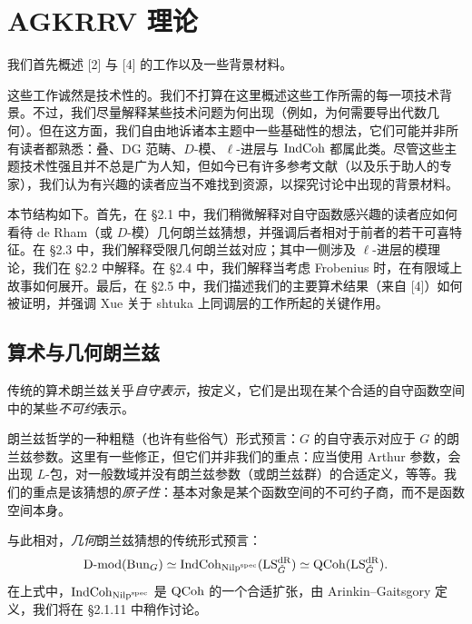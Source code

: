 \section{AGKRRV 理论}

我们首先概述 [2] 与 [4] 的工作以及一些背景材料。

这些工作诚然是技术性的。我们不打算在这里概述这些工作所需的每一项技术背景。不过，我们尽量解释某些技术问题为何出现（例如，为何需要导出代数几何）。但在这方面，我们自由地诉诸本主题中一些基础性的想法，它们可能并非所有读者都熟悉：叠、DG 范畴、$D$-模、$\ell$-进层与 $\mathrm{IndCoh}$ 都属此类。尽管这些主题技术性强且并不总是广为人知，但如今已有许多参考文献（以及乐于助人的专家），我们认为有兴趣的读者应当不难找到资源，以探究讨论中出现的背景材料。

本节结构如下。首先，在 §2.1 中，我们稍微解释对自守函数感兴趣的读者应如何看待 de Rham（或 $D$-模）几何朗兰兹猜想，并强调后者相对于前者的若干可喜特征。在 §2.3 中，我们解释受限几何朗兰兹对应；其中一侧涉及 $\ell$-进层的模理论，我们在 §2.2 中解释。在 §2.4 中，我们解释当考虑 Frobenius 时，在有限域上故事如何展开。最后，在 §2.5 中，我们描述我们的主要算术结果（来自 [4]）如何被证明，并强调 Xue 关于 shtuka 上同调层的工作所起的关键作用。

\subsection{算术与几何朗兰兹}

 传统的算术朗兰兹关乎\emph{自守表示}，按定义，它们是出现在某个合适的自守函数空间中的某些\emph{不可约}表示。

朗兰兹哲学的一种粗糙（也许有些俗气）形式预言：$G$ 的自守表示对应于 $G$ 的朗兰兹参数。这里有一些修正，但它们并非我们的重点：应当使用 Arthur 参数，会出现 $L$-包，对一般数域并没有朗兰兹参数（或朗兰兹群）的合适定义，等等。我们的重点是该猜想的\emph{原子性}：基本对象是某个函数空间的不可约子商，而不是函数空间本身。

 与此相对，\emph{几何}朗兰兹猜想的传统形式预言：
\begin{equation}
  \mathrm{D}\text{-}\mathrm{mod}(\mathrm{Bun}_G) \simeq \mathrm{IndCoh}_{\mathrm{Nilp}^{\mathrm{spec}}}(\mathrm{LS}^{\mathrm{dR}}_{\check{G}}) \simeq \mathrm{QCoh}(\mathrm{LS}^{\mathrm{dR}}_{\check{G}}).
\end{equation}
在上式中，$\mathrm{IndCoh}_{\mathrm{Nilp}^{\mathrm{spec}}}$ 是 $\mathrm{QCoh}$ 的一个合适扩张，由 Arinkin--Gaitsgory 定义，我们将在 §2.1.11 中稍作讨论。

